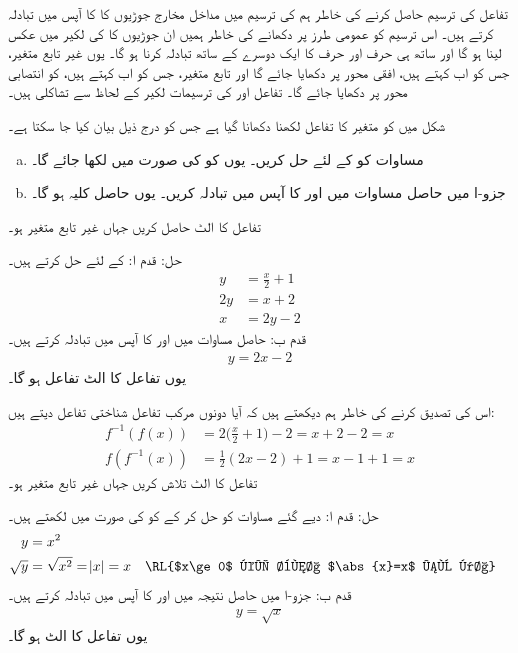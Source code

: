 تفاعل  کی ترسیم حاصل کرنے کی خاطر ہم  کی ترسیم میں مداخل مخارج جوڑیوں کا  کا آپس میں تبادلہ  کرتے ہیں۔ اس ترسیم کو عمومی طرز پر دکھانے کی خاطر ہمیں ان جوڑیوں کا  کی لکیر  میں عکس لینا ہو گا اور ساتھ ہی  حرف  اور حرف  کا ایک دوسرے کے ساتھ تبادلہ کرنا ہو گا۔ یوں غیر تابع متغیر، جس کو اب  کہتے ہیں، افقی محور پر دکھایا جائے گا اور تابع متغیر، جس کو اب  کہتے ہیں، کو انتصابی محور پر دکھایا جائے گا۔ تفاعل  اور  کی ترسیمات لکیر  کے لحاظ سے تشاکلی ہیں۔

شکل میں  کو متغیر  کا تفاعل لکھنا دکھانا گیا ہے جس کو درج ذیل بیان کیا جا سکتا ہے۔
\begin{enumerate}[a.]
\item
مساوات  کو   کے لئے حل کریں۔ یوں  کو  کی صورت میں لکھا جائے گا۔
\item
جزو-ا میں حاصل مساوات میں  اور  کا آپس میں تبادلہ کریں۔ یوں حاصل کلیہ  ہو گا۔
\end{enumerate} 

تفاعل  کا الٹ حاصل کریں جہاں غیر تابع متغیر  ہو۔

حل:\quad
قدم ا:\quad
{} کے لئے حل کرتے ہیں۔
\begin{align*}
y&=\frac{x}{2}+1\\
2y&=x+2\\
x&=2y-2
\end{align*}
قدم ب:\quad
حاصل مساوات میں  اور  کا آپس میں تبادلہ کرتے ہیں۔
\begin{align*}
y=2x-2
\end{align*}
یوں تفاعل  کا الٹ تفاعل  ہو گا۔

اس کی تصدیق کرنے کی خاطر ہم دیکھتے ہیں کہ آیا دونوں مرکب تفاعل شناختی تفاعل دیتے ہیں:
\begin{align*}
f^{-1}(f(x))&=2\big(\frac{x}{2}+1\big)-2=x+2-2=x\\
f(f^{-1}(x))&=\frac{1}{2}(2x-2)+1=x-1+1=x
\end{align*}
تفاعل  کا الٹ تلاش کریں جہاں غیر تابع متغیر  ہو۔

حل:\quad
قدم ا:\quad
دیے گئے مساوات کو حل کر کے  کو  کی صورت میں لکھتے ہیں۔
\begin{align*}
y&=x^2\\
\sqrt{y}&=\sqrt{x^2}=\abs{x}=x&&\text{\RL{$x\ge 0$ کی بنا $\abs{x}=x$ ہو گا}}
\end{align*}
قدم ب:\quad
جزو-ا میں حاصل نتیجہ میں  اور  کا آپس میں تبادلہ کرتے ہیں۔
\begin{align*}
y=\sqrt{x}
\end{align*}
یوں تفاعل  کا الٹ  ہو گا۔

